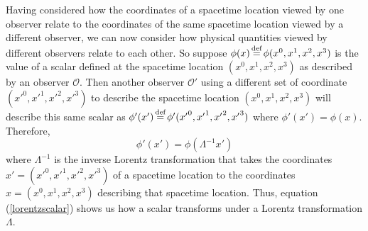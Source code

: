 Having considered how the coordinates of a spacetime location viewed by one observer relate to the coordinates of the same spacetime location viewed by a different observer, we can now consider how physical quantities viewed by different observers relate to each other. So suppose $\phi(x)\myeq\phi(x^0, x^1, x^2, x^3)$ is the value of a scalar defined at the spacetime location $(x^0, x^1, x^2, x^3)$ as described by an observer $\mathcal{O}$. Then another observer $\mathcal{O}'$ using a different set of coordinate $({x'}^0, {x'}^1, {x'}^2, {x'}^3)$ to describe the spacetime location $(x^0, x^1, x^2, x^3)$ will describe this same scalar as $\phi'(x')\myeq\phi'({x'}^0, {x'}^1, {x'}^2, {x'}^3)$  where $\phi'(x')=\phi(x)$. Therefore,
\begin{equation}\label{lorentzscalar}
\phi'(x')=\phi(\Lambda^{-1}x')
\end{equation} 
where $\Lambda^{-1}$ is the inverse Lorentz transformation that takes the coordinates $x'=({x'}^0, {x'}^1, {x'}^2, {x'}^3)$ of a spacetime location to the coordinates $x=(x^0, x^1, x^2, x^3)$ describing that spacetime location. Thus, equation (\ref{lorentzscalar}) shows us how a scalar transforms under a Lorentz transformation $\Lambda$. 

